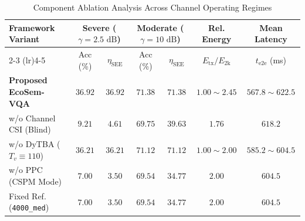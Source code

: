 \begin{table}[!t]
\centering
\caption{Component Ablation Analysis Across Channel Operating Regimes}
\label{tab:ablation_study}
\footnotesize
\begin{tabular}{lcccccc}
\toprule
\multirow{2}{*}{\textbf{Framework Variant}} & \multicolumn{2}{c}{\textbf{Severe ($\gamma = 2.5\text{ dB}$)}} & \multicolumn{2}{c}{\textbf{Moderate ($\gamma = 10\text{ dB}$)}} & \textbf{Rel. Energy} & \textbf{Mean Latency} \\
\cmidrule(lr){2-3} \cmidrule(lr){4-5}
& Acc (\%) & $\eta_{\mathrm{SEE}}$ & Acc (\%) & $\eta_{\mathrm{SEE}}$ & $E_{\mathrm{tx}}/E_{2\mathrm{k}}$ & $t_{\mathrm{e2e}}$ (ms) \\
\midrule
\textbf{Proposed EcoSem-VQA} & $\mathbf{36.92}$ & $\mathbf{36.92}$ & $\mathbf{71.38}$ & $\mathbf{71.38}$ & $\mathbf{1.00 \sim 2.45}$ & $\mathbf{567.8 \sim 622.5}$ \\
w/o Channel CSI (Blind) & $9.21$ & $4.61$ & $69.75$ & $39.63$ & $1.76$ & $618.2$ \\
w/o DyTBA ($T_v \equiv 110$) & $36.21$ & $36.21$ & $71.12$ & $71.12$ & $1.00 \sim 2.00$ & $585.2 \sim 604.5$ \\
w/o PPC (CSPM Mode) & $7.00$ & $3.50$ & $69.54$ & $34.77$ & $2.00$ & $604.5$ \\
Fixed Ref. (\texttt{4000\_med}) & $7.00$ & $3.50$ & $69.54$ & $34.77$ & $2.00$ & $604.5$ \\
\bottomrule
\end{tabular}
\end{table}

